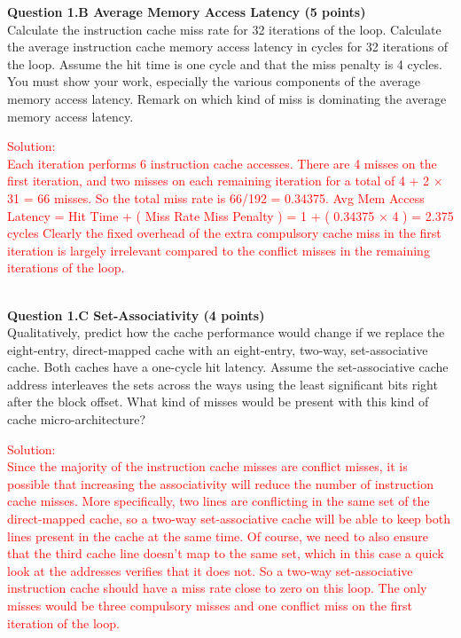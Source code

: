 \documentclass[a4paper,10pt]{article}
\begin{document}
\begin{enumerate}
\textbf{Question 1.B Average Memory Access Latency (5 points)}\\
Calculate the instruction cache miss rate for 32 iterations of the loop. Calculate the average instruction cache memory access latency in cycles for 32 iterations of the loop. Assume the hit time is one cycle and that the miss penalty is 4 cycles. You must show your work, especially the various components of the average memory access latency. Remark on which kind of miss is dominating the average memory access latency.\\

\noindent\fbox
{%
    \parbox{\linewidth}
    {%

\textcolor{red}{Solution: \\
Each iteration performs 6 instruction cache accesses. There are 4 misses on the first iteration, and two misses on each remaining iteration for a total of 4 + 2 × 31 = 66 misses. So the total miss rate is 66/192 = 0.34375. Avg Mem Access Latency = Hit Time + ( Miss Rate Miss Penalty ) = 1 + ( 0.34375 × 4 ) = 2.375 cycles Clearly the fixed overhead of the extra compulsory cache miss in the first iteration is largely irrelevant compared to the conflict misses in the remaining iterations of the loop.}
    }%
}
\\

\textbf{Question 1.C Set-Associativity (4 points)}\\
Qualitatively, predict how the cache performance would change if we replace the eight-entry, direct-mapped cache with an eight-entry, two-way, set-associative cache. Both caches have a one-cycle hit latency. Assume the set-associative cache address interleaves the sets across the ways using the least significant bits right after the block offset. What kind of misses would be present with this kind of cache micro-architecture?\\

\noindent\fbox
{%
    \parbox{\linewidth}
    {%

\textcolor{red}{Solution: \\
Since the majority of the instruction cache misses are conflict misses, it is possible that increasing the associativity will reduce the number of instruction cache misses. More specifically, two lines are conflicting in the same set of the direct-mapped cache, so a two-way set-associative cache will be able to keep both lines present in the cache at the same time. Of course, we need to also ensure that the third cache line doesn’t map to the same set, which in this case a quick look at the addresses verifies that it does not. So a two-way set-associative instruction cache should have a miss rate close to zero on this loop. The only misses would be three compulsory misses and one conflict miss on the first iteration of the loop.}

}}
\end{enumerate}
\end{document}
